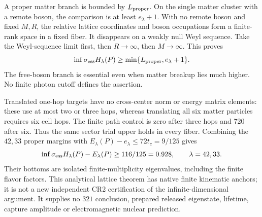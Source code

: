 A proper matter branch is bounded by $L_{\rm proper}$. On the single
matter cluster with a remote boson, the comparison is at least
$e_\lambda+1$. With no remote boson and fixed $M,R$, the relative lattice
coordinates and boson occupations form a finite-rank space in a fixed
fiber. It disappears on a weakly null Weyl sequence. Take the Weyl-sequence
limit first, then $R\to\infty$, then $M\to\infty$. This proves
\begin{equation}
 \inf\sigma_{\rm ess}H_\lambda(P)
 \ge\min\{L_{\rm proper},e_\lambda+1\}.
\label{eq:fiber-threshold-12}
\end{equation}
The free-boson branch is essential even when matter breakup lies much
higher. No finite photon cutoff defines the assertion.

Translated one-hop targets have no cross-center norm or energy matrix
elements: these use at most two or three hops, whereas translating all
six matter particles requires six cell hops. The finite path control is
zero after three hops and 720 after six. Thus the same sector trial upper
holds in every fiber. Combining the $42,33$ proper margins with
$E_\lambda(P)-e_\lambda\le72t_c=9/125$ gives
\begin{equation}
 \inf\sigma_{\rm ess}H_\lambda(P)-E_\lambda(P)
 \ge116/125=0.928,\qquad\lambda=42,33.
\label{eq:fiber-gap-12}
\end{equation}
Their bottoms are isolated finite-multiplicity eigenvalues, including the
finite flavor factors. This analytical lattice theorem has native finite
kinematic anchors; it is not a new independent CR2 certification of the
infinite-dimensional argument. It supplies no $321$ conclusion, prepared
released eigenstate, lifetime, capture amplitude or electromagnetic
nuclear prediction.
